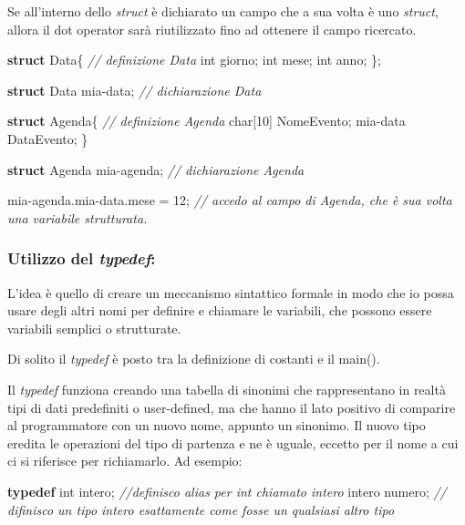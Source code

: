 \documentclass[
]{article}
\newenvironment{Shaded}{}{}
\newcommand{\CommentTok}[1]{\textcolor[rgb]{0.38,0.63,0.69}{\textit{#1}}}
\newcommand{\DataTypeTok}[1]{\textcolor[rgb]{0.56,0.13,0.00}{#1}}
\newcommand{\DecValTok}[1]{\textcolor[rgb]{0.25,0.63,0.44}{#1}}
\newcommand{\KeywordTok}[1]{\textcolor[rgb]{0.00,0.44,0.13}{\textbf{#1}}}
\newcommand{\NormalTok}[1]{#1}
\begin{document}
Se all'interno dello \emph{struct} è dichiarato un campo che a sua volta
è uno \emph{struct}, allora il dot operator sarà riutilizzato fino ad
ottenere il campo ricercato.

\begin{Shaded}
\begin{Highlighting}[]
\KeywordTok{struct}\NormalTok{ Data\{				}\CommentTok{// definizione Data}
	\DataTypeTok{int}\NormalTok{ giorno;}
	\DataTypeTok{int}\NormalTok{ mese;}
	\DataTypeTok{int}\NormalTok{ anno;}
\NormalTok{\};}

\KeywordTok{struct}\NormalTok{ Data mia{-}data;		}\CommentTok{// dichiarazione Data}

\KeywordTok{struct}\NormalTok{ Agenda\{				}\CommentTok{// definizione Agenda}
    \DataTypeTok{char}\NormalTok{[}\DecValTok{10}\NormalTok{] NomeEvento;}
\NormalTok{    mia{-}data DataEvento;}
\NormalTok{\}}

\KeywordTok{struct}\NormalTok{ Agenda mia{-}agenda;	}\CommentTok{// dichiarazione Agenda}

\NormalTok{mia{-}agenda.mia{-}data.mese = }\DecValTok{12}\NormalTok{;}
    						\CommentTok{// accedo al campo di Agenda, che è sua volta una variabile strutturata.}
\end{Highlighting}
\end{Shaded}

\hypertarget{header-n622}{%
\subsubsection{\texorpdfstring{Utilizzo del
\emph{typedef}:}{Utilizzo del typedef:}}\label{header-n622}}

L'idea è quello di creare un meccanismo sintattico formale in modo che
io possa usare degli altri nomi per definire e chiamare le variabili,
che possono essere variabili semplici o strutturate.

Di solito il \emph{typedef} è posto tra la definizione di costanti e il
main().

Il \emph{typedef} funziona creando una tabella di sinonimi che
rappresentano in realtà tipi di dati predefiniti o user-defined, ma che
hanno il lato positivo di comparire al programmatore con un nuovo nome,
appunto un sinonimo. Il nuovo tipo eredita le operazioni del tipo di
partenza e ne è uguale, eccetto per il nome a cui ci si riferisce per
richiamarlo. Ad esempio:

\begin{Shaded}
\begin{Highlighting}[]
\KeywordTok{typedef} \DataTypeTok{int}\NormalTok{ intero;  }\CommentTok{//definisco alias per \textquotesingle{}int\textquotesingle{} chiamato intero}
\NormalTok{intero numero; 		 }\CommentTok{// difinisco un tipo \textquotesingle{}intero\textquotesingle{} esattamente come fosse un qualsiasi altro tipo}
\end{Highlighting}
\end{Shaded}
\end{document}
